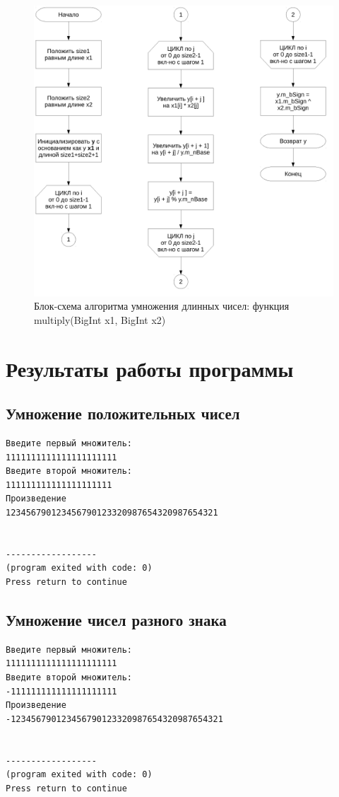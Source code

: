 \documentclass[a4paper,12pt]{article} %
\begin{document}
\begin{figure}[ht]
	\includegraphics[width=\textwidth]{lr2_multiply.pdf}
	\caption{Блок-схема алгоритма умножения длинных чисел: функция multiply(BigInt x1, BigInt x2)}
\end{figure}


\clearpage

\section*{Результаты работы программы}

\subsection*{Умножение положительных чисел}
\begin{verbatim}
Введите первый множитель:
1111111111111111111111
Введите второй множитель:
111111111111111111111
Произведение
123456790123456790123320987654320987654321


------------------
(program exited with code: 0)
Press return to continue
\end{verbatim}

\subsection*{Умножение чисел разного знака}
\begin{verbatim}
Введите первый множитель:
1111111111111111111111
Введите второй множитель:
-111111111111111111111
Произведение
-123456790123456790123320987654320987654321


------------------
(program exited with code: 0)
Press return to continue
\end{verbatim}
\end{document}

